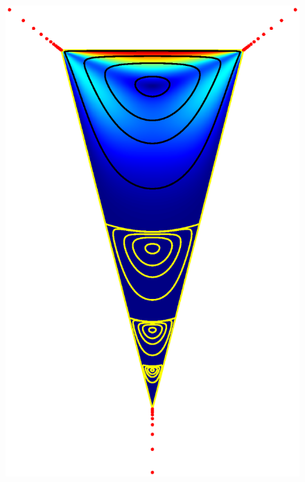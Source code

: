 \begin{figure}[H]
	\centering
	\begin{minipage}{0.45\linewidth}
		\centering
		\includegraphics[width=\linewidth]{Figures/wedge}
	\end{minipage}
	\hfill
	\begin{minipage}{0.45\linewidth}
		\centering

\end{minipage}
\end{figure}
